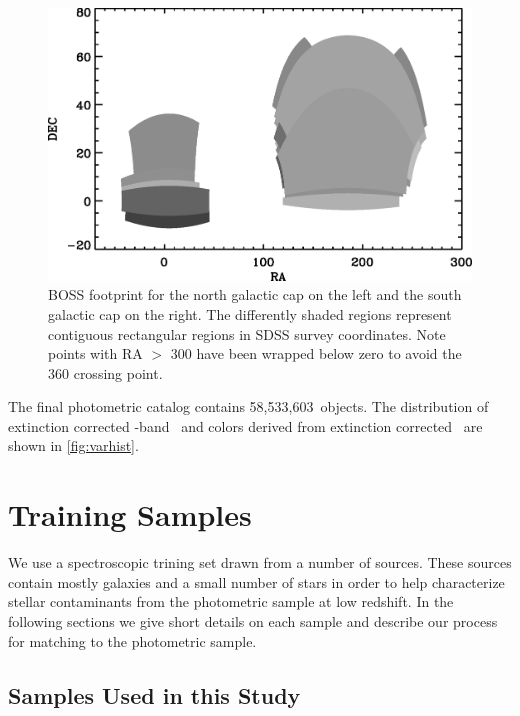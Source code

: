 \documentclass[preprint]{aastex}
\newcommand{\nphoto}{58,533,603}
\begin{document}
\begin{figure}[t] \centering
 \centering 
 \includegraphics[scale=0.75]{figures/boss-poly-coverage.eps}
 \caption{BOSS footprint for the north galactic cap on the left
 and the south galactic cap on the right.  The differently shaded
 regions represent contiguous rectangular regions in SDSS survey coordinates.
 Note points with RA $>$ 300 have been wrapped below zero 
 to avoid the 360 crossing point.}
 \label{fig:footprint}
\end{figure}

The final photometric catalog contains \nphoto\ objects.  The distribution of
extinction corrected \rmag-band \cmodelmag\ and colors derived from extinction
corrected \modelmag\ are shown in \ref{fig:varhist}.

\section{Training Samples} \label{sec:train}

We use a spectroscopic trining set drawn from a number of sources. These
sources contain mostly galaxies and a small number of stars in order to help
characterize stellar contaminants from the photometric sample at low redshift.
In the following sections we give short details on each sample and describe our
process for matching to the photometric sample.

\subsection{Samples Used in this Study} \label{sec:train:def}

\end{document}
